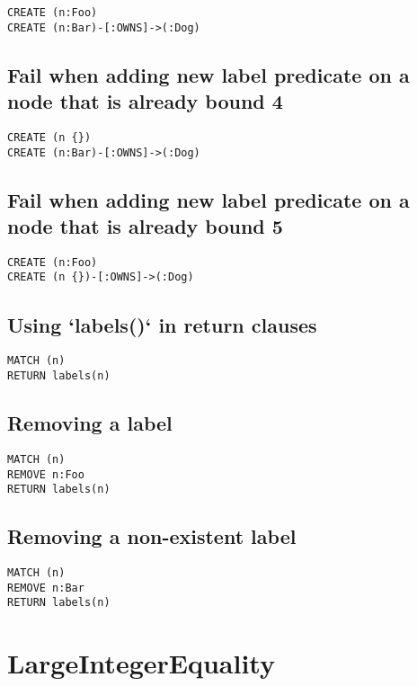 \begin{lstlisting}
CREATE (n:Foo)
CREATE (n:Bar)-[:OWNS]->(:Dog)
\end{lstlisting}

\subsection{Fail when adding new label predicate on a node that is already bound 4}

\begin{lstlisting}
CREATE (n {})
CREATE (n:Bar)-[:OWNS]->(:Dog)
\end{lstlisting}

\subsection{Fail when adding new label predicate on a node that is already bound 5}

\begin{lstlisting}
CREATE (n:Foo)
CREATE (n {})-[:OWNS]->(:Dog)
\end{lstlisting}

\subsection{Using `labels()` in return clauses}

\begin{lstlisting}
MATCH (n)
RETURN labels(n)
\end{lstlisting}

\subsection{Removing a label}

\begin{lstlisting}
MATCH (n)
REMOVE n:Foo
RETURN labels(n)
\end{lstlisting}

\subsection{Removing a non-existent label}

\begin{lstlisting}
MATCH (n)
REMOVE n:Bar
RETURN labels(n)
\end{lstlisting}
\section{LargeIntegerEquality}


